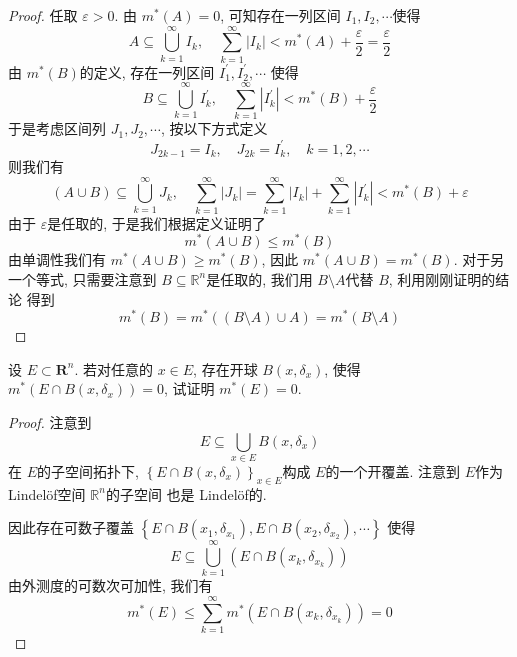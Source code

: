 \documentclass[../main.tex]{subfiles}
\begin{document}
\begin{proof}
    任取 \(   \varepsilon > 0  \). 由 \(  m^{*}\left( A \right)   = 0\), 可知存在一列区间 \(  I_1,I_2,\cdots   \)使得 \[
    A\subseteq \bigcup _{k= 1}^{\infty}I_{k},\quad \sum _{k= 1}^{\infty}\left| I_{k} \right|< m^{*}\left( A \right)+ \frac{ \varepsilon  }{2 }= \frac{ \varepsilon  }{2 }    
    \]由 \(  m^{*}\left( B \right)   \)的定义, 存在一列区间 \(  I_1^{\prime} ,I_2^{\prime} ,\cdots   \) 使得 \[
    B\subseteq \bigcup _{k= 1}^{\infty}I_{k}^{\prime} ,\quad \sum _{k= 1}^{\infty}\left| I_{k}^{\prime}  \right|< m^{*}\left( B \right)  +  \frac{ \varepsilon  }{2 } 
    \]    于是考虑区间列 \(  J_1,J_2,\cdots   \), 按以下方式定义\[
   J_{2k-1}= I_{k}, \quad J_{2k}= I_{k}^{\prime} ,\quad k= 1,2,\cdots 
    \] 则我们有 \[
    \left( A\cup B \right)\subseteq \bigcup _{k= 1}^{\infty}J_{k} ,\quad \sum _{k= 1}^{\infty}\left| J_{k} \right| = \sum _{k= 1}^{\infty}\left| I_{k} \right| + \sum _{k= 1}^{\infty}\left| I_{k}^{\prime}  \right|< m^{*}\left( B \right)+  \varepsilon   
    \]由于 \(   \varepsilon   \)是任取的, 于是我们根据定义证明了 \[
    m^{*}\left( A\cup B \right)\le m^{*}\left( B \right)  
    \]由单调性我们有 \(  m^{*}\left( A\cup B \right)\ge m^{*}\left( B \right)    \), 因此 \(  m^{*}\left( A\cup B \right)= m^{*}\left( B \right)    \).  对于另一个等式, 只需要注意到 \(  B\subseteq \mathbb{R} ^{n}  \)是任取的, 我们用 \(  B\setminus A  \)代替 \(  B  \), 利用刚刚证明的结论 得到 \[
    m^{*}\left( B \right)= m^{*}\left( \left( B\setminus A \right)  \cup A\right)= m^{*}\left( B\setminus A \right)   
    \]      
\end{proof}

\begin{exercise}{}{}
设 $E \subset \mathbf{R}^n$. 若对任意的 $x \in E$, 存在开球 $B(x, \delta_x)$, 使得 $m^*(E \cap B(x, \delta_x)) = 0$, 试证明 $m^*(E) = 0$.
\end{exercise}


\begin{proof}
    注意到 \[
    E\subseteq \bigcup _{x \in E} B\left( x, \delta _{x} \right) 
    \]在 \(  E  \)的子空间拓扑下,  \(  \left\{E\cap  B\left( x, \delta _{x} \right)  \right\}_{x \in E}  \)构成  \(  E  \)的一个开覆盖. 注意到 \(  E  \)作为Lindel\"of空间 \(  \mathbb{R} ^{n}  \)的子空间    也是 Lindel\"of的.
    
    因此存在可数子覆盖 \(  \left\{ E\cap B\left( x_1, \delta _{x_1} \right),E\cap B\left( x_2, \delta _{x_2} \right),\cdots    \right\}  \) 使得 \[
    E\subseteq \bigcup _{k= 1}^{\infty}\left( E\cap B\left( x_{k}, \delta _{x_{k}} \right)  \right) 
    \]由外测度的可数次可加性, 我们有 \[
    m^{*}\left( E \right)\le \sum _{k= 1}^{\infty}m^{*}\left( E\cap B\left( x_{k}, \delta _{x_{k}} \right)  \right)= 0  
    \]
\end{proof}
\end{document}
